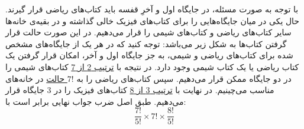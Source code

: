 \p
 با توجه به صورت مسئله، در جایگاه اول و آخرِ قفسه باید کتاب‌های ریاضی قرار گیرند.
  حال یکی در میان جایگاه‌هایی را برای کتاب‌های فیزیک خالی گذاشته و در بقیه‌ی خانه‌ها سایر کتاب‌های ریاضی و کتاب‌های شیمی را قرار می‌دهیم.
 در این صورت حالت قرار گرفتن کتاب‌ها به شکل زیر می‌باشد:
\vspace*{+0.5cm}
\vspace*{+0.4cm}
\p
توجه کنید که در هر یک از جایگاه‌های مشخص شده برای کتاب‌های ریاضی و شیمی، به جز جایگاه اول و آخر، امکان قرار گرفتن یک کتاب ریاضی یا یک کتاب شیمی وجود دارد. 
در نتیجه با
\underline{ترتیب 2 از 7}
کتاب‌های شیمی را در دو جایگاه ممکن 
  قرار می‌دهیم.
 سپس کتاب‌‌های ریاضی را به
 \underline{$7!$ حالت}
 در خانه‌های مناسب
 می‌چینیم.
 در نهایت با
 \underline{ترتیب 3 از 8}
  کتاب‌های فیزیک را
در 3 جایگاه قرار می‌دهیم.
  طبق اصل ضرب جواب نهایی برابر است با:
$$\frac{7!}{5!}\times7! \times \frac{8!}{5!}$$